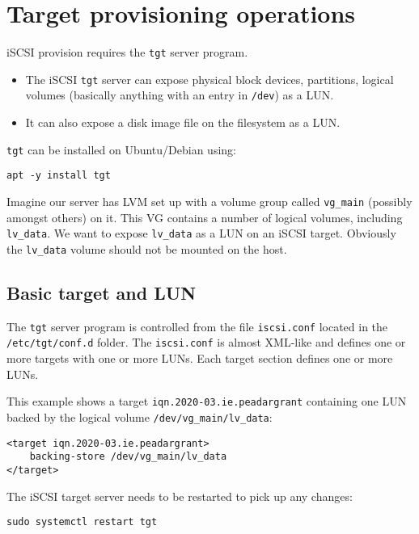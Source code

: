 \section{Target provisioning
operations}\label{target-provisioning-operations}

iSCSI provision requires the \texttt{tgt} server program.
\begin{itemize}
  \item The iSCSI \texttt{tgt} server can expose physical block devices, partitions,
logical volumes (basically anything with an entry in \texttt{/dev}) as a
LUN.
\item It can also expose a disk image file on the filesystem as a LUN.
\end{itemize}

\texttt{tgt} can be installed on Ubuntu/Debian using:

\begin{verbatim}
apt -y install tgt
\end{verbatim}


Imagine our server has LVM set up with a volume group called
\texttt{vg\_main} (possibly amongst others) on it. This VG contains a
number of logical volumes, including \texttt{lv\_data}. We want to
expose \texttt{lv\_data} as a LUN on an iSCSI target. Obviously the
\texttt{lv\_data} volume should not be mounted on the host.

\subsection{Basic target and LUN}\label{basic-target-and-lun}

The \texttt{tgt} server program is controlled from the file
\texttt{iscsi.conf} located in the \texttt{/etc/tgt/conf.d} folder. The
\texttt{iscsi.conf} is almost XML-like and defines one or more targets
with one or more LUNs. Each target section defines one or more LUNs.

This example shows a target \texttt{iqn.2020-03.ie.peadargrant}
containing one LUN backed by the logical volume
\texttt{/dev/vg\_main/lv\_data}:

\begin{verbatim}
<target iqn.2020-03.ie.peadargrant>
    backing-store /dev/vg_main/lv_data
</target>
\end{verbatim}

The iSCSI target server needs to be restarted to pick up any changes:

\begin{verbatim}
sudo systemctl restart tgt
\end{verbatim}

